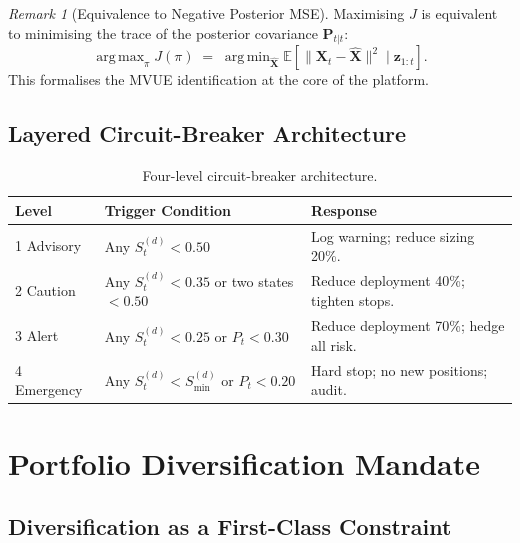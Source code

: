 \documentclass[12pt,openany]{book}
\newcommand{\E}{\mathbb{E}}
\newcommand{\calP}{\mathcal{P}}
\DeclareMathOperator*{\argmax}{arg\,max}
\DeclareMathOperator*{\argmin}{arg\,min}
\numberwithin{equation}{chapter}
\theoremstyle{plain}
\theoremstyle{definition}
\theoremstyle{remark}
\newtheorem{remark}[theorem]{Remark}
\def\mathcal#1{#1}%
\def\calP{P}%
\begin{document}
\begin{remark}[Equivalence to Negative Posterior MSE]
Maximising $J$ is equivalent to minimising the trace of the
posterior covariance $\mathbf{P}_{t|t}$:
\begin{equation}
  \argmax_\pi J(\pi)
  \;=\;
  \argmin_{\hat{\mathbf{X}}}
  \E\!\left[\|\mathbf{X}_t - \hat{\mathbf{X}}\|^2
      \mid \mathbf{z}_{1:t}\right].
\end{equation}
This formalises the MVUE identification at the core of the platform.
\end{remark}

\section{Layered Circuit-Breaker Architecture}

\begin{table}[H]
\centering
\caption{Four-level circuit-breaker architecture.}
\label{tab:circuit-breakers}
\small
\begin{tabularx}{\textwidth}{@{} l X X @{}}
\toprule
\textbf{Level} & \textbf{Trigger Condition} & \textbf{Response} \\
\midrule
1 Advisory    & Any $\mathcal{S}_t^{(d)} < 0.50$
              & Log warning; reduce sizing 20\%. \\
2 Caution     & Any $\mathcal{S}_t^{(d)} < 0.35$
                or two states $< 0.50$
              & Reduce deployment 40\%; tighten stops. \\
3 Alert       & Any $\mathcal{S}_t^{(d)} < 0.25$
                or $\calP_t < 0.30$
              & Reduce deployment 70\%; hedge all risk. \\
4 Emergency   & Any $\mathcal{S}_t^{(d)} < \mathcal{S}_{\min}^{(d)}$
                or $\calP_t < 0.20$
              & Hard stop; no new positions; audit. \\
\bottomrule
\end{tabularx}
\end{table}

\chapter{Portfolio Diversification Mandate}
\label{ch:diversification}

\section{Diversification as a First-Class Constraint}
\end{document}
